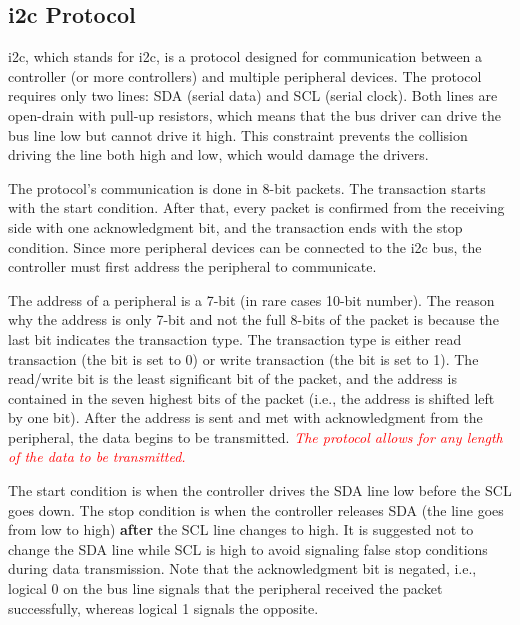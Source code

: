 \documentclass[
  digital,     %
  oneside,     %
  nosansbold,  %
  nocolorbold, %
  nolof,         %
  nolot,         %
]{fithesis4}
\newcommand{\TODO}[1]{\textcolor{red}{\textit{#1}}}
\begin{document}
{{{\subsection[ Inter-Integrated Circuit Protocol ]{ \acrlong{i2c} Protocol } \label{sec:i2c}
\acrshort{i2c}, which stands for \acrlong{i2c}, is a protocol designed for communication between a controller (or more controllers) and multiple peripheral devices. The protocol requires only two lines: SDA (serial data) and SCL (serial clock). Both lines are open-drain with pull-up resistors, which means that the bus driver can drive the bus line low but cannot drive it high. This constraint prevents the collision driving the line both high and low, which would damage the drivers.

The protocol's communication is done in 8-bit packets. The transaction starts with the start condition. After that, every packet is confirmed from the receiving side with one acknowledgment bit, and the transaction ends with the stop condition. Since more peripheral devices can be connected to the \acrshort{i2c} bus, the controller must first address the peripheral to communicate.

The address of a peripheral is a 7-bit (in rare cases 10-bit number). The reason why the address is only 7-bit and not the full 8-bits of the packet is because the last bit indicates the transaction type. The transaction type is either read transaction (the bit is set to 0) or write transaction (the bit is set to 1). The read/write bit is the least significant bit of the packet, and the address is contained in the seven highest bits of the packet (i.e., the address is shifted left by one bit). After the address is sent and met with acknowledgment from the peripheral, the data begins to be transmitted. \TODO{The protocol allows for any length of the data to be transmitted.}

The start condition is when the controller drives the SDA line low before the SCL goes down. The stop condition is when the controller releases SDA (the line goes from low to high) \textbf{after} the SCL line changes to high. It is suggested not to change the SDA line while SCL is high to avoid signaling false stop conditions during data transmission. Note that the acknowledgment bit is negated, i.e., logical 0 on the bus line signals that the peripheral received the packet successfully, whereas logical 1 signals the opposite.


}}}
\end{document}
